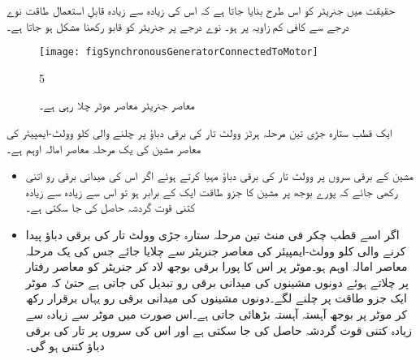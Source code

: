 حقیقت میں جنریٹر کو اس طرح بنایا جاتا ہے کہ اس کی زیادہ سے زیادہ قابلِ استعمال طاقت نوے درجے سے کافی کم زاویہ پر ہو۔ نوے درجے پر جنریٹر کو قابو رکھنا مشکل ہو جاتا ہے۔
%
\begin{figure}
\centering
\texttt{[image: figSynchronousGeneratorConnectedToMotor]}
\caption{معاصر جنریٹر معاصر موٹر چلا رہی ہے۔}
\label{شکل_معاصر_جنریٹر_موٹر_چلاتا_ہوا}
5\end{figure}
ایک  قطب ستارہ جڑی تین مرحلہ  ہرٹز  وولٹ تار کی برقی دباؤ پر چلنے والی  کلو وولٹ-ایمپیئر کی معاصر مشین کی یک مرحلہ  معاصر امالہ  اوہم ہے۔
\begin{itemize}
\item
مشین کے برقی سروں پر  وولٹ تار کی برقی دباؤ مہیا کرتے ہوئے اگر اس کی میدانی برقی رو اتنی رکھی جائے کہ پورے بوجھ پر مشین کا جزو طاقت ایک کے برابر ہو تو اس سے زیادہ سے زیادہ کتنی قوت گردشہ حاصل کی جا سکتی ہے۔
\item
اگر اسے    قطب   چکر فی منٹ تین مرحلہ ستارہ جڑی  وولٹ تار کی برقی دباؤ پیدا کرنے والی   کلو وولٹ-ایمپیئر کی معاصر جنریٹر سے چلایا جائے جس کی یک مرحلہ معاصر امالہ  اوہم ہو۔موٹر پر اس کا پورا برقی بوجھ لاد کر جنریٹر کو معاصر رفتار پر چلاتے ہوئے دونوں مشینوں کی میدانی برقی رو تبدیل کی جاتی ہے حتیٰ کہ موٹر ایک جزو طاقت پر چلنے لگے۔دونوں مشینوں کی میدانی برقی رو یہاں برقرار رکھ کر موٹر پر بوجھ آہستہ آہستہ بڑھائی جاتی ہے۔اس صورت میں موٹر سے زیادہ سے زیادہ کتنی قوت گردشہ  حاصل کی جا سکتی ہے اور اس کی سروں پر تار کی برقی دباؤ کتنی ہو گی۔ 
\end{itemize}

